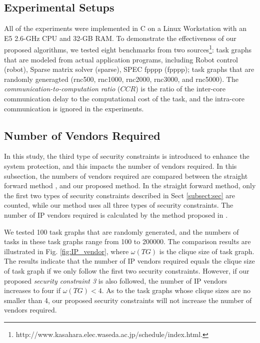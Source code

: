 \documentclass[conference]{IEEEtran}
\begin{document}
\subsection{Experimental Setups}
All of the experiments were implemented in C on a Linux Workstation with an E5 2.6-GHz CPU and 32-GB RAM. To demonstrate the effectiveness of our proposed algorithms, we tested eight benchmarks from two sources\footnote{http://www.kasahara.elec.waseda.ac.jp/schedule/index.html.}: task graphs that are modeled from actual application programs, including Robot control (robot), Sparse matrix solver (sparse), SPEC fpppp (fpppp); task graphs that are randomly generagted (rnc500, rnc1000, rnc2000, rnc3000, and rnc5000). The \textit{communication-to-computation ratio} ($CCR$) is the ratio of the inter-core communication delay to the computational cost of the task, and the intra-core communication is ignored in the experiments.



\subsection{Number of Vendors Required}
In this study, the third type of security constraints is introduced to enhance the system protection, and this impacts the number of vendors required. In this subsection, the numbers of vendors required are compared between the straight forward method \cite{article:CL}, and our proposed method. In the straight forward method, only the first two types of security constraints described in Sect \ref{subsect:sec} are counted, while our method uses all three types of security constraints. The number of IP vendors required is calculated by the method proposed in \cite{article:CL}.%

We tested 100 task graphs that are randomly generated, and the numbers of tasks in these task graphs range from 100 to 200000. The comparison results are illustrated in Fig. \ref{fig:IP_vendor}, where $\omega(TG)$ is the clique size of task graph. The results indicate that the number of IP vendors required equals the clique size of task graph if we only follow the first two security constraints. However, if our proposed \textit{security constraint 3} is also followed, the number of IP vendors increases to four if $\omega(TG)<4$. As to the task graphs whose clique sizes are no smaller than 4, our proposed security constraints will not increase the number of vendors required.
\end{document}
